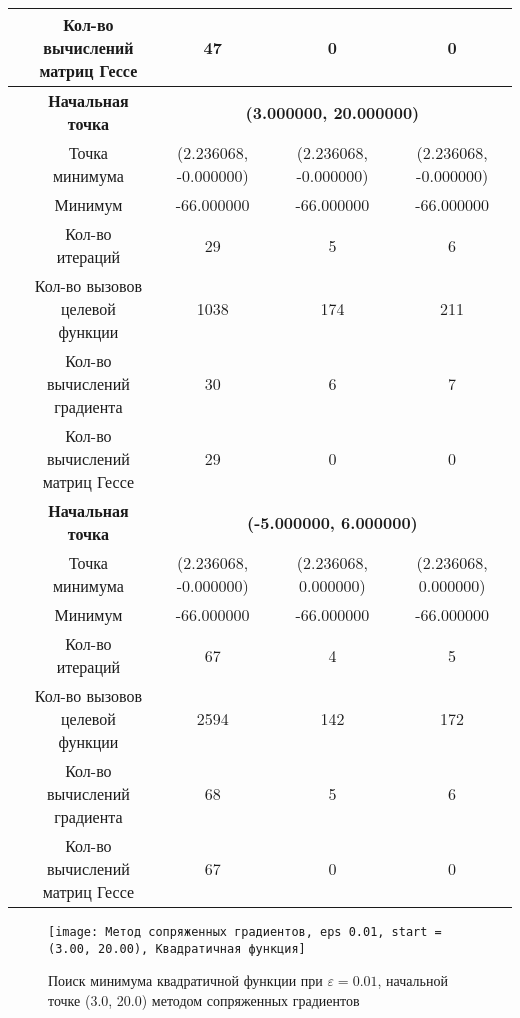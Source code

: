 \begin{table}[H]
\begin{tabular}{|c|c|c|c|c|}
	\cline{2-5}
	&\makecell{Кол-во вычислений\\матриц Гессе} &47 &0 &0 \\ 
	\cline{2-5}
	\hline
	\multirow{12}{*}{\rotatebox[origin=c]{90}{$\varepsilon = 1e-06$}}&\textbf{Начальная точка} &\multicolumn{3}{c|}{\textbf{(3.000000, 20.000000)}}\\
	\cline{2-5}
	&Точка минимума &(2.236068, -0.000000) &(2.236068, -0.000000) &(2.236068, -0.000000) \\ 
	\cline{2-5}
	&Минимум &-66.000000 &-66.000000 &-66.000000 \\ 
	\cline{2-5}
	&Кол-во итераций &29 &5 &6 \\ 
	\cline{2-5}
	&\makecell{Кол-во вызовов\\целевой функции} &1038 &174 &211 \\ 
	\cline{2-5}
	&\makecell{Кол-во вычислений\\градиента} &30 &6 &7 \\ 
	\cline{2-5}
	&\makecell{Кол-во вычислений\\матриц Гессе} &29 &0 &0 \\ 
	\cline{2-5}
\cline{2-5}&\textbf{Начальная точка} &\multicolumn{3}{c|}{\textbf{(-5.000000, 6.000000)}}\\
	\cline{2-5}
	&Точка минимума &(2.236068, -0.000000) &(2.236068, 0.000000) &(2.236068, 0.000000) \\ 
	\cline{2-5}
	&Минимум &-66.000000 &-66.000000 &-66.000000 \\ 
	\cline{2-5}
	&Кол-во итераций &67 &4 &5 \\ 
	\cline{2-5}
	&\makecell{Кол-во вызовов\\целевой функции} &2594 &142 &172 \\ 
	\cline{2-5}
	&\makecell{Кол-во вычислений\\градиента} &68 &5 &6 \\ 
	\cline{2-5}
	&\makecell{Кол-во вычислений\\матриц Гессе} &67 &0 &0 \\ 
	\cline{2-5}
	\hline

\end{tabular}
\end{table}


            \begin{figure}[H]
	        \centering
	        \texttt{[image: Метод сопряженных градиентов, eps 0.01, start = (3.00, 20.00), Квадратичная функция]}%
	        \caption{Поиск минимума квадратичной функции при $\varepsilon = 0.01$, начальной точке (3.0, 20.0) методом сопряженных градиентов}
	        \vspace*{-1.2cm}
            \end{figure}
            
